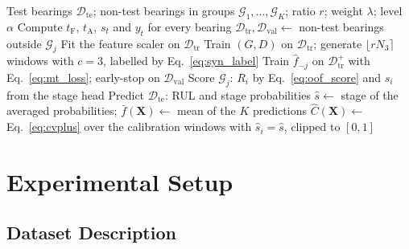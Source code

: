 \documentclass[review]{elsarticle}
\begin{document}
\begin{algorithm}[!htbp]
\caption{Proposed framework for one set of test bearings.}
\label{alg:framework}
\begin{algorithmic}[1]
\Require Test bearings $\mathcal{D}_{\mathrm{te}}$; non-test bearings
         in groups $\mathcal{G}_1, \dots, \mathcal{G}_K$; ratio $r$;
         weight $\lambda$; level $\alpha$
\State Compute $t_{\mathrm{F}}$, $t_{\mathrm{A}}$, $s_t$ and $y_t$ for
       every bearing 
  \State $\mathcal{D}_{\mathrm{tr}}, \mathcal{D}_{\mathrm{val}} \gets$
         non-test bearings outside $\mathcal{G}_j$
  \State Fit the feature scaler on $\mathcal{D}_{\mathrm{tr}}$
   
    \State Train $(G, D)$ on $\mathcal{D}_{\mathrm{tr}}$; generate
           $\lfloor r N_3 \rceil$ windows with $c=3$, labelled by
           Eq.~\eqref{eq:syn_label}
  \EndIf
  \State Train $\hat{f}_{-j}$ on $\mathcal{D}_{\mathrm{tr}}^{+}$ with
         Eq.~\eqref{eq:mt_loss}; early-stop on $\mathcal{D}_{\mathrm{val}}$
  \State Score $\mathcal{G}_j$: $R_i$ by Eq.~\eqref{eq:oof_score} and
         $\hat{s}_i$ from the stage head
  \State Predict $\mathcal{D}_{\mathrm{te}}$: RUL and stage probabilities
\EndFor
{} 
  \State $\hat{s} \gets$ stage of the averaged probabilities;
         $\bar{f}(\mathbf{X}) \gets$ mean of the $K$ predictions
  \State $\hat{C}(\mathbf{X}) \gets$ Eq.~\eqref{eq:cvplus} over the
         calibration windows with $\hat{s}_i = \hat{s}$, clipped to $[0,1]$
\EndFor
\end{algorithmic}
\end{algorithm}


\section{Experimental Setup}
\label{sec:experimental_setup}

\subsection{Dataset Description}
\label{sec:dataset}
\end{document}
